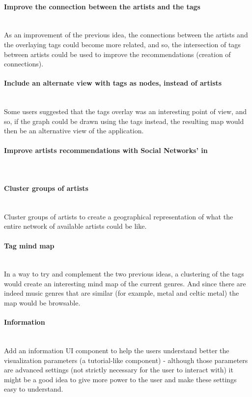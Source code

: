   \paragraph*{Improve the connection between the artists and the tags} \hfill \\
  \indent As an improvement of the previous idea, the connections between the artists and the overlaying tags could become more related, and so, the intersection of tags between artists could be used to improve the recommendations (creation of connections). 

  \paragraph*{Include an alternate view with tags as nodes, instead of artists} \hfill \\
  \indent Some users suggested that the tags overlay was an interesting point of view, and so, if the graph could be drawn using the tags instead, the resulting map would then be an alternative view of the application.

  \paragraph*{Improve artists recommendations with Social Networks' in} \hfill \\
  \indent %

  \paragraph*{Cluster groups of artists} \hfill \\
  \indent Cluster groups of artists to create a geographical representation of what the entire network of available artists could be like.

  \paragraph*{Tag mind map} \hfill \\
  \indent In a way to try and complement the two previous ideas, a clustering of the tags would create an interesting mind map of the current genres.
  And since there are indeed music genres that are similar (for example, metal and celtic metal) the map would be browsable.

  \paragraph*{Information} \hfill \\
  \indent Add an information UI component to help the users understand better the visualization parameters (a tutorial-like component) - although those parameters are advanced settings (not strictly necessary for the user to interact with) it might be a good idea to give more power to the user and make these settings easy to understand.

